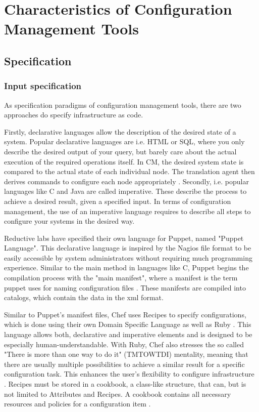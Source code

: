 \section{Characteristics of Configuration Management Tools}

\subsection{Specification}

\subsubsection{Input specification}

As specification paradigms of configuration management tools, there are two approaches do specify infrastructure as code. 

Firstly, declarative languages allow the description of the desired state of a system. Popular declarative languages are i.e. HTML or SQL, where you only describe the desired output of your query, but barely care about the actual execution of the required operations itself. In CM, the desired system state is compared to the actual state of each individual node. The translation agent then derives commands to configure each node appropriately \cite{delaet2010survey}. Secondly, i.e. popular languages like C and Java are called imperative. These describe the process to achieve a desired result, given a specified input. In terms of configuration management, the use of an imperative language requires to describe all steps to configure your systems in the desired way.

Reductive labs have specified their own language for Puppet, named "Puppet Language". This declarative language is inspired by the Nagios file format to be easily accessible by system administrators without requiring much programming experience.
Similar to the main method in languages like C, Puppet begins the compilation process with the "main manifest", where a manifest is the term puppet uses for naming configuration files \cite{puppetcomlangsum}. These manifests are compiled into catalogs, which contain the data in the xml format.

Similar to Puppet's manifest files, Chef uses Recipes to specify configurations, which is done using their own Domain Specific Language as well as Ruby \cite{pandey2012investigating}. This language allows both, declarative and imperative elements and is designed to be especially human-understandable. With Ruby, Chef also stresses the so called "There is more than one way to do it" (TMTOWTDI) mentality, meaning that there are usually multiple possibilities to achieve a similar result for a specific configuration task. This enhances the user's flexibility to configure infrastructure \cite{https://docs.chef.io/recipes.html}. Recipes must be stored in a cookbook, a class-like structure, that can, but is not limited to Attributes and Recipes. A cookbook contains all necessary resources and policies for a configuration item \cite{chefiocookbooks}. 

